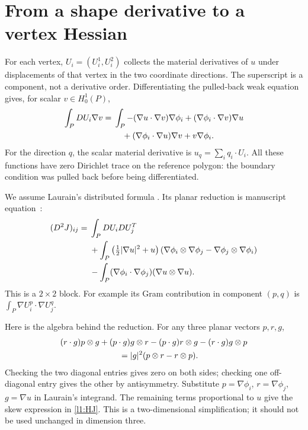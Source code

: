 \section{From a shape derivative to a vertex Hessian}
\label{l1:vertex}
For each vertex, $U_i=(U_i^1,U_i^2)$ collects the material derivatives of
$u$ under displacements of that vertex in the two coordinate directions.
The superscript is a component, not a derivative order. Differentiating
the pulled-back weak equation gives, for scalar $v\in H^1_0(P)$,
\begin{align}
 \int_P DU_i\nabla v={}&
 \int_P-(\nabla u\cdot\nabla v)\nabla\phi_i
 +(\nabla\phi_i\cdot\nabla v)\nabla u\notag\\
 &\quad +(\nabla\phi_i\cdot\nabla u)\nabla v+v\nabla\phi_i.
 \label{l1:material}
\end{align}
For the direction $q$, the scalar material derivative is
$u_q=\sum_iq_i\cdot U_i$. All these functions have zero Dirichlet trace
on the reference polygon: the boundary condition was pulled back before
being differentiated.

We assume Laurain's distributed formula \cite[Proposition 14]{Laurain2020}.
Its planar reduction is manuscript equation~:
\begin{align}
 (D^2J)_{ij}={}&\int_P DU_iDU_j^T\notag\\
 &+\int_P\left(\tfrac12|\nabla u|^2+u\right)
 (\nabla\phi_i\otimes\nabla\phi_j-
  \nabla\phi_j\otimes\nabla\phi_i)\notag\\
 &-\int_P(\nabla\phi_i\cdot\nabla\phi_j)
              (\nabla u\otimes\nabla u).
 \label{l1:HJ}
\end{align}
This is a $2\times2$ block. For example its Gram contribution in component
$(p,q)$ is $\int_P\nabla U_i^p\cdot\nabla U_j^q$.

Here is the algebra behind the reduction. For any three planar vectors
$p,r,g$,
\begin{align*}
 &(r\cdot g)p\otimes g+(p\cdot g)g\otimes r
 -(p\cdot g)r\otimes g-(r\cdot g)g\otimes p\\
 &\hspace{25mm}=|g|^2(p\otimes r-r\otimes p).
\end{align*}
Checking the two diagonal entries gives zero on both sides; checking one
off-diagonal entry gives the other by antisymmetry. Substitute
$p=\nabla\phi_i$, $r=\nabla\phi_j$, $g=\nabla u$ in Laurain's integrand.
The remaining terms proportional to $u$ give the skew expression in
\eqref{l1:HJ}. This is a two-dimensional simplification; it should not be
used unchanged in dimension three.

